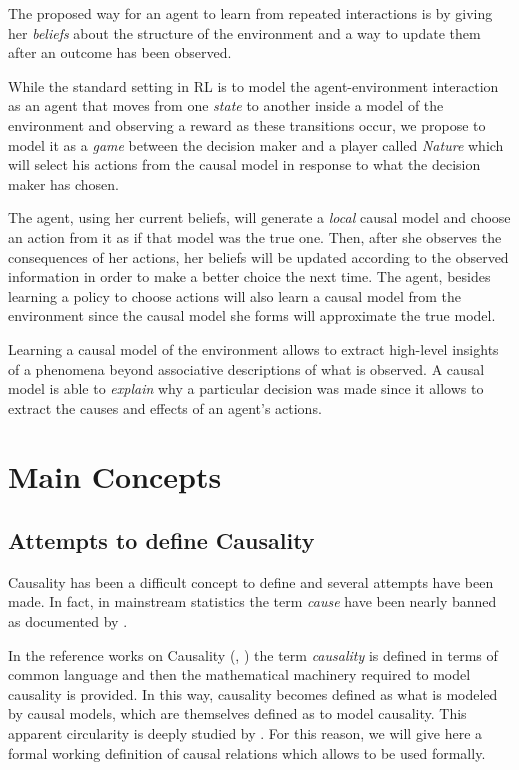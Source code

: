 \documentclass[11pt]{article}
\theoremstyle{plain}
\begin{document}
The proposed way for an agent to learn from repeated interactions is by giving her \textit{beliefs} about the structure of the environment and a way to update them after an outcome has been observed.

While the standard setting in RL is to model the agent-environment interaction as an agent that moves from one \textit{state} to another inside a model of the environment and observing a reward as these transitions occur, we propose to model it as a \textit{game} between the decision maker and a player called \textit{Nature} which will select his actions from the causal model in response to what the decision maker has chosen. 

The agent, using her current beliefs, will generate a \textit{local} causal model and choose an action from it as if that model was the true one. Then, after she observes the consequences of her actions, her beliefs will be updated according to the observed information in order to make a better choice the next time. The agent, besides learning a policy to choose actions will also learn a causal model from the environment since the causal model she forms will approximate the true model.

Learning a causal model of the environment allows to extract high-level insights of a phenomena beyond associative descriptions of what is observed. A causal model is able to \textit{explain} why a particular decision was made since it allows to extract the causes and effects of an agent's actions.

\newpage
\section{Main Concepts}
	\subsection{Attempts to define Causality}
	Causality has been a difficult concept to define and several attempts have been made. In fact, in mainstream statistics  the term \textit{cause} have been nearly banned as documented by \cite{pearl2018why}.
	
	In the reference works on Causality (\cite{spirtes2000causation}, \cite{pearl2009causality}) the term \textit{causality} is defined in terms of common language and then the mathematical machinery required to model causality is provided. In this way, causality becomes defined as what is modeled by causal models, which are themselves defined as to model causality. This apparent circularity is deeply studied by \cite{woodward2005making}. For this reason, we will give here a formal working definition of causal relations which allows to be used formally.
	
\end{document}
